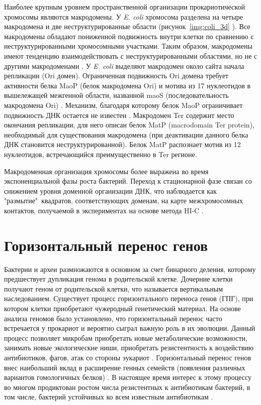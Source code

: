 Наиболее крупным уровнем пространственной организации прокариотической хромосомы являются макродомены. У \textit{E. coli} хромосома разделена на четыре макродомена и две неструктурированные области (рисунок~\ref{img:coli_3d} ). Все макродомены обладают пониженной подвижность внутри клетки по сравнению с неструктурированными хромосомными участками. Таким образом, макродомены имеют тенденцию взаимодействовать с неструктурированными областями, но не с другими макродоменами \cite{espeli2008dna}. У \textit{E. coli} выделяют макродомен около сайта начала репликации (Ori домен). Ограниченная подвижность Ori домена требует активности белка MaoP (белок макродомена Ori) и мотива из 17 нуклеотидов в вышележащей межгенной области, названной maoS (последовательность макродомена Ori) \cite{valens2016maop}. Механизм, благодаря которому белок MaoP ограничивает подвижность ДНК остается не известен \cite{dame2020chromosome}. Макродомен Ter содержит место окончания репликации, для него описан белок MatP (macrodomain Ter protein), необходимый для существования макродомена (при деактивации данного белка ДНК становится неструктурированной). Белок MatP распознает мотив из 12 нуклеотидов, встречающийся преимущественно в Ter регионе. 

Макродоменная организация хромосомы более выражена во время экспоненциальной фазы роста бактерий. Переход к стационарной фазе связан со снижением уровня доменной организации ДНК, что наблюдается как "размытие"\ квадратов, соответствующих доменам, на карте межхромосомных контактов, получаемой в экспериментах на основе метода HI-C \cite{lioy2018multiscale}.

\section{Горизонтальный перенос генов}
Бактерии и археи размножаются в основном за счет бинарного деления, которому предшествует дупликация генома в родительской клетке. Дочерние клетки получают геном от родительской клетки, что называется вертикальным наследованием. Существует процесс горизонтального переноса генов (ГПГ), при котором клетки приобретают чужеродный генетический материал. На основе анализа геномов было установлено, что горизонтальный перенос часто встречается у прокариот и вероятно сыграл важную роль в их эволюции. Данный процесс позволяет микробам приобретать новые метаболические возможности, занимать новые экологические ниши, приобретать резистентность к воздействию антибиотиков, фагов, атак со стороны эукариот \cite{ochman2000lateral, rodriguez2016flexible, niehus2015migration}. Горизонтальный перенос генов внес наибольший вклад в расширение генных семейств (появления различных вариантов гомологичных белков) \cite{treangen2011horizontal}. В настоящее время интерес к этому процессу во многом продиктован ростом числа резистентных к антибиотикам бактерий, в том числе, бактерий устойчивых ко всем известным антибиотикам \cite{sun2019horizontal}. 


